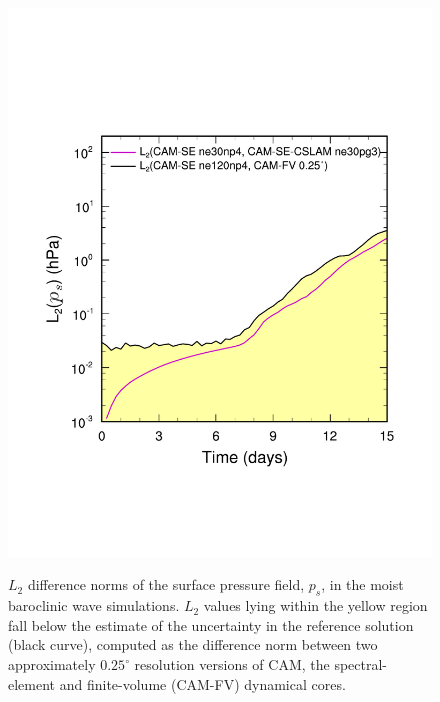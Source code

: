 \documentclass[twocol]{ametsoc}
\begin{document}
\begin{figure}[t]
\begin{center}
\noindent\includegraphics[width=37pc,angle=0]{figs/temp_l2.pdf}\\
\end{center}
\caption{$L_2$ difference norms of the surface pressure field, $p_s$, in the moist baroclinic wave simulations. $L_2$ values lying within the yellow region fall below the estimate of the uncertainty in the reference solution (black curve), computed as the difference norm between two approximately $0.25^\circ$ resolution versions of CAM, the spectral-element and finite-volume (CAM-FV) dynamical cores.}
\label{fig:norm}
\end{figure}
\end{document}
